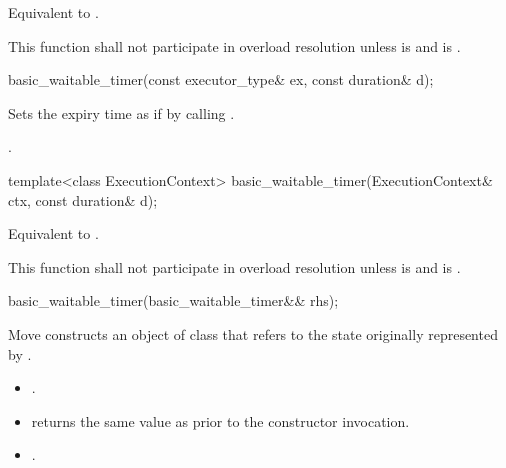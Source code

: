\begin{itemdescr}
\pnum
\effects Equivalent to .

\pnum
\remarks This function shall not participate in overload resolution unless
 is 
and  is .
\end{itemdescr}

\begin{itemdecl}
basic_waitable_timer(const executor_type& ex, const duration& d);
\end{itemdecl}

\begin{itemdescr}
\pnum
\effects Sets the expiry time as if by calling .

\pnum
\postconditions {}.
\end{itemdescr}

\begin{itemdecl}
template<class ExecutionContext>
  basic_waitable_timer(ExecutionContext& ctx, const duration& d);
\end{itemdecl}

\begin{itemdescr}
\pnum
\effects Equivalent to .

\pnum
\remarks This function shall not participate in overload resolution unless
 is 
and  is .
\end{itemdescr}

\begin{itemdecl}
basic_waitable_timer(basic_waitable_timer&& rhs);
\end{itemdecl}

\begin{itemdescr}
\pnum
\effects Move constructs an object of class  that refers to the state originally represented by .

\pnum
\postconditions
\begin{itemize}
\item
{}.
\item
{} returns the same value as  prior to the constructor invocation.
\item
{}.
\end{itemize}
\end{itemdescr}




